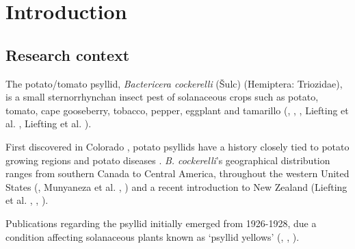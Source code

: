 \documentclass{UIdahoMastersThesis}
\begin{document}
 \listoffigures
 \newpage



\mainmatter  %
\setcounter{secnumdepth}{3}  %




\clearpage
\chapter{Introduction}
\label{ch:intro}

\section{Research context}
\raggedright
\setlength\parindent{2em}
The potato/tomato psyllid, \textit{Bactericera cockerelli} (Šulc) (Hemiptera: Triozidae), is a small sternorrhynchan insect pest of solanaceous crops such as potato, tomato, cape gooseberry, tobacco, pepper, eggplant and tamarillo (\cite{Aguilar2013}, \cite{Martin2008}, \cite{Knowlton1934}, Liefting et al. \citeyear{Liefting2008}, Liefting et al. \citeyear{Liefting2009} \cite{Wallis1955}).

First discovered in Colorado \autocite{Sulc1909}, potato psyllids have a history closely tied to potato growing regions and potato diseases \autocite{Richards1973}. \textit{B. cockerelli}’s geographical distribution ranges from southern Canada to Central America, throughout the western United States (\cite{Butler2012a}, Munyaneza et al.  \citeyear{Munyaneza2007a}, \cite{Rehman2010}) and a recent introduction to New Zealand (Liefting et al. \citeyear{Liefting2009}, \cite{Martin2008}, \cite{Teulon2009}). 

Publications regarding the psyllid initially emerged from 1926-1928, due a condition affecting solanaceous plants known as ‘psyllid yellows’ (\cite{Eyer1933}, \cite{Richards1928}, \cite{Richards1973}).
\end{document}
